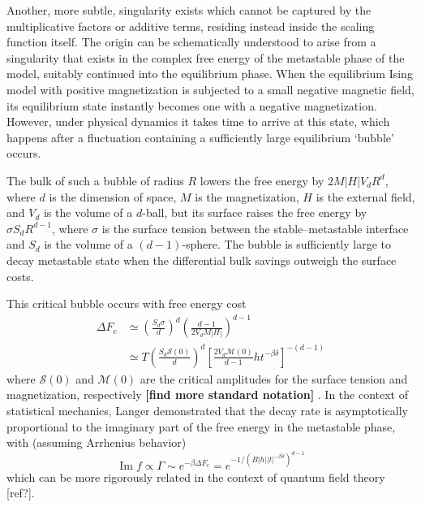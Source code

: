 \documentclass[
  aps,
  prb,
  reprint,
  longbibliography,
  floatfix
]{revtex4-2}
\begin{document}
Another, more subtle, singularity exists which cannot be captured by the
multiplicative factors or additive terms, residing instead inside the scaling
function itself. The origin can be schematically understood to arise from a
singularity that exists in the complex free energy of the metastable phase of
the model, suitably continued into the equilibrium phase. When the equilibrium
Ising model with positive magnetization is subjected to a small negative
magnetic field, its equilibrium state instantly becomes one with a negative
magnetization. However, under physical dynamics it takes time to arrive at this
state, which happens after a fluctuation containing a sufficiently large
equilibrium `bubble' occurs.

The bulk of such a bubble of radius $R$ lowers the free energy by
$2M|H|V_dR^d$, where $d$ is the dimension of space, $M$ is the magnetization,
$H$ is the external field, and $V_d$ is the volume of a $d$-ball, but its
surface raises the free energy by $\sigma S_dR^{d-1}$, where $\sigma$ is the
surface tension between the stable--metastable interface and $S_d$ is the
volume of a $(d-1)$-sphere. The bubble is sufficiently large to decay
metastable state when the differential bulk savings outweigh the surface costs.

This critical bubble occurs with free energy cost
\begin{equation}
  \begin{aligned}
    \Delta F_c
      &\simeq\left(\frac{S_d\sigma}d\right)^d\left(\frac{d-1}{2V_dM|H|}\right)^{d-1} \\
      &\simeq T\left(\frac{S_d\mathcal S(0)}d\right)^d\left[\frac{2V_d\mathcal M(0)}{d-1}ht^{-\beta\delta}\right]^{-(d-1)}
  \end{aligned}
\end{equation}
where $\mathcal S(0)$ and $\mathcal M(0)$ are the critical amplitudes for the
surface tension and magnetization, respectively \textbf{[find more standard
notation]} \cite{Kent-Dobias_2020_Novel}.
In the context of statistical mechanics, Langer demonstrated that the decay rate is asymptotically proportional to the imaginary part of the free energy in the metastable phase, with (assuming Arrhenius behavior)
\begin{equation}
  \operatorname{Im}f\propto\Gamma\sim e^{-\beta\Delta F_c}=e^{-1/(B|h||t|^{-\beta\delta})^{d-1}}
\end{equation}
which can be more rigorously related in the context of quantum field theory [ref?].
  
\end{document}
